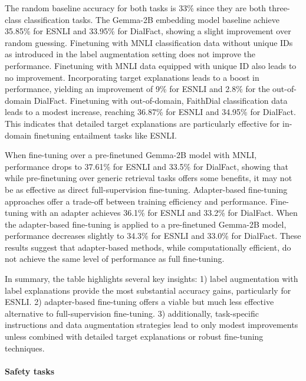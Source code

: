 The random baseline accuracy for both tasks is 33\% since they are both three-class classification tasks. The Gemma-2B embedding model baseline achieve 35.85\% for ESNLI and 33.95\% for DialFact, showing a slight improvement over random guessing. Finetuning with MNLI classification data without unique IDs as introduced in the label augmentation setting does not improve the performance. Finetuning with MNLI data equipped with unique ID also leads to no improvement. Incorporating target explanations leads to a boost in performance, yielding an improvement of 9\% for ESNLI and 2.8\% for the out-of-domain DialFact.
Finetuning with out-of-domain, FaithDial classification data \citep{dziri-etal-2022-faithdial} leads to a modest increase, reaching 36.87\% for ESNLI and 34.95\% for DialFact. This indicates that detailed target explanations are particularly effective for in-domain finetuning entailment tasks like ESNLI. 

 When fine-tuning over a pre-finetuned Gemma-2B model with MNLI, performance drops to 37.61\% for ESNLI and 33.5\% for DialFact, showing that while pre-finetuning over generic retrieval tasks offers some benefits, it may not be as effective as direct full-supervision fine-tuning. Adapter-based fine-tuning approaches offer a trade-off between training efficiency and performance. Fine-tuning with an adapter achieves 36.1\% for ESNLI and 33.2\% for DialFact. When the adapter-based fine-tuning is applied to a pre-finetuned Gemma-2B model, performance decreases slightly to 34.3\% for ESNLI and 33.0\% for DialFact. These results suggest that adapter-based methods, while computationally efficient, do not achieve the same level of performance as full fine-tuning.

In summary, the table highlights several key insights: 1) label augmentation with label explanations provide the most substantial accuracy gains, particularly for ESNLI. 2) adapter-based fine-tuning offers a viable but much less effective alternative to full-supervision fine-tuning. 3) additionally, task-specific instructions and data augmentation strategies lead to only modest improvements unless combined with detailed target explanations or robust fine-tuning techniques.


\paragraph{Safety tasks}

